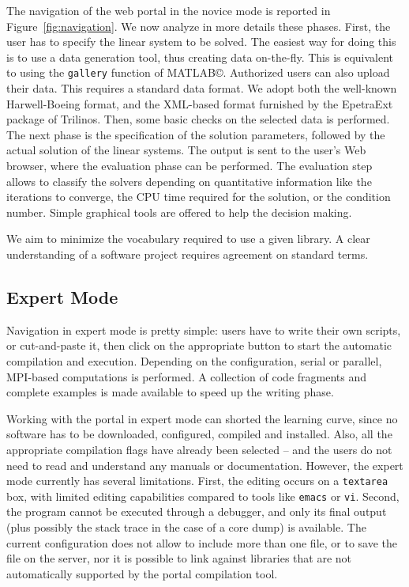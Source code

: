 \documentclass[11pt,relax]{SANDreport}
\begin{document}
The navigation of the web portal in the novice mode is reported in
Figure~\ref{fig:navigation}. 
We now analyze in more details these phases. First, the user has to specify
the linear system to be solved. The easiest way for doing this is to use a
data generation tool, thus creating data on-the-fly. This is equivalent to
using the {\tt gallery} function of MATLAB\copyright. Authorized users can
also upload their data. This requires a standard data format. We adopt both
the well-known Harwell-Boeing format, and the XML-based format furnished by
the EpetraExt package of Trilinos. Then, some basic checks on the selected
data is performed. The next phase is the specification of the solution
parameters, followed by the actual solution of the linear systems. The output
is sent to the user's Web browser, where the evaluation phase can be
performed. The evaluation step allows to classify the solvers depending on
quantitative information like the iterations to converge, the CPU time
required for the solution, or the condition number.  Simple graphical tools
are offered to help the decision making.

We aim to minimize the vocabulary required to use a given library. A clear
understanding of a software project requires agreement on standard terms.

\subsection{Expert Mode}

Navigation in expert mode is pretty simple: users have to write their own
scripts, or cut-and-paste it, then click on the appropriate button to start
the automatic compilation and execution. Depending on the configuration,
serial or parallel, MPI-based computations is performed. A collection of code
fragments and complete examples is made available to speed up the writing
phase.

Working with the portal in expert mode can shorted the learning curve, since
no software has to be downloaded, configured, compiled and installed. Also,
all the appropriate compilation flags have already been selected -- and the
users do not need to read and understand any manuals or documentation.
However, the expert mode currently has several limitations. First, the editing
occurs on a \verb!textarea! box, with limited editing capabilities compared to
tools like \verb!emacs! or \verb!vi!. Second, the program cannot be executed
through a debugger, and only its final output (plus possibly the stack trace
                                               in the case of a core dump) is
available. The current configuration does not allow to include more than one
file, or to save the file on the server, nor it is possible to link against
libraries that are not automatically supported by the portal compilation tool.
\end{document}
